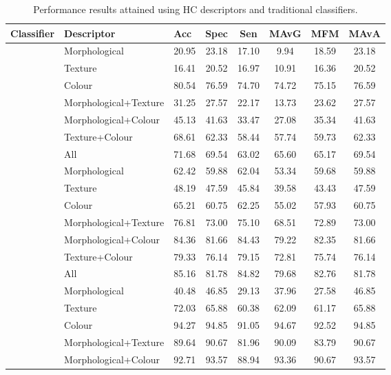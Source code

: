 \documentclass[twocolumn]{svjour3}           %
\begin{document}
\begin{table}[tbhp]
    \centering
	\addtolength{\tabcolsep}{-0.1pt}
	\renewcommand{\arraystretch}{0.8}
	\caption{Performance results attained using HC descriptors and traditional classifiers.}
    \small
	\begin{tabular}{lllccccc}
		\toprule
		Classifier & Descriptor & Acc & Spec  & Sen & MAvG  & MFM & MAvA \\
		\midrule
		\multirow{7}{*}{\rotatebox[origin=c]{0}{kNN}}
		&Morphological & 20.95 & 23.18 & 17.10 & 9.94 & 18.59 & 23.18 \\
		&Texture & 16.41 & 20.52 & 16.97 & 10.91 & 16.36 & 20.52 \\
		&Colour & 80.54 & 76.59 & 74.70 & 74.72 & 75.15 & 76.59 \\
		&Morphological+Texture & 31.25 & 27.57 & 22.17 & 13.73 & 23.62 & 27.57 \\
		&Morphological+Colour & 45.13 & 41.63 & 33.47 & 27.08 & 35.34 & 41.63 \\
		&Texture+Colour & 68.61 & 62.33 & 58.44 & 57.74 & 59.73 & 62.33 \\
		&All & 71.68 & 69.54 & 63.02 & 65.60 & 65.17 & 69.54 \\ 
		\midrule
		\multirow{7}{*}{\rotatebox[origin=c]{0}{Naive Bayes}}
		&Morphological & 62.42 & 59.88 & 62.04 & 53.34 & 59.68 & 59.88 \\
		&Texture & 48.19 & 47.59 & 45.84 & 39.58 & 43.43 & 47.59 \\
		&Colour & 65.21 & 60.75 & 62.25 & 55.02 & 57.93 & 60.75 \\
		&Morphological+Texture & 76.81 & 73.00 & 75.10 & 68.51 & 72.89 & 73.00 \\
		&Morphological+Colour & 84.36 & 81.66 & 84.43 & 79.22 & 82.35 & 81.66 \\
		&Texture+Colour & 79.33 & 76.14 & 79.15 & 72.81 & 75.74 & 76.14 \\ 
		&All & 85.16 & 81.78 & 84.82 & 79.68 & 82.76 & 81.78 \\ 
		\midrule
		\multirow{7}{*}{\rotatebox[origin=c]{0}{RF}}
		&Morphological & 40.48 & 46.85 & 29.13 & 37.96 & 27.58 & 46.85 \\
		&Texture & 72.03 & 65.88 & 60.38 & 62.09 & 61.17 & 65.88 \\
		&Colour & 94.27 & 94.85 & 91.05 & 94.67 & 92.52 & 94.85 \\
		&Morphological+Texture & 89.64 & 90.67 & 81.96 & 90.09 & 83.79 & 90.67 \\
		&Morphological+Colour & 92.71 & 93.57 & 88.94 & 93.36 & 90.67 & 93.57 \\

\end{tabular}
\end{table}
\end{document}
